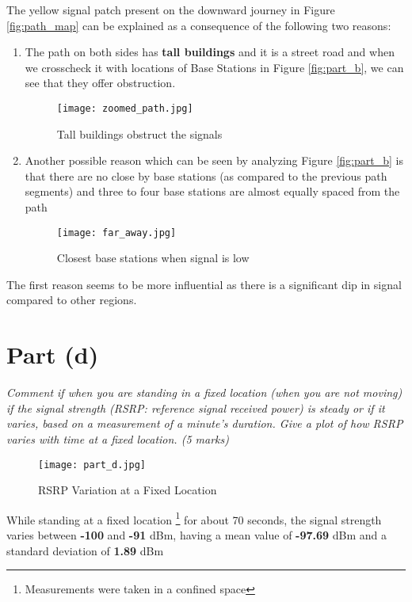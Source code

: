 \documentclass[11pt, fleqn]{article}
\begin{document}
The yellow signal patch present on the downward journey in Figure \ref{fig:path_map} can be explained as a consequence of the following two reasons:
\begin{enumerate}
    \item The path on both sides has \textbf{tall buildings} and it is a street road and when we crosscheck it with locations of Base Stations in Figure \ref{fig:part_b}, we can see that they offer obstruction.
        
    \begin{figure}[H]
        \centering
        \texttt{[image: zoomed\_path.jpg]}
        \caption{Tall buildings obstruct the signals}
    \end{figure}
    
    \item Another possible reason which can be seen by analyzing Figure \ref{fig:part_b} is that there are no close by base stations (as compared to the previous path segments) and three to four base stations are almost equally spaced from the path
    
    \begin{figure}[H]
        \centering
        \texttt{[image: far\_away.jpg]}
        \caption{Closest base stations when signal is low}
    \end{figure}
    
\end{enumerate}
The first reason seems to be more influential as there is a significant dip in signal compared to other regions.



\newpage
\section*{Part (d)}
\label{partd}
\setcounter{equation}{0}

\textit{Comment if when you are standing in a fixed location (when you are not moving) if the signal strength (RSRP: reference signal received power) is steady or if it varies, based on a measurement of a minute’s duration. Give a plot of how RSRP varies with time at a fixed location. (5 marks)}

\begin{figure}[H]
    \centering
    \texttt{[image: part\_d.jpg]}
    \caption{RSRP Variation at a Fixed Location}
\end{figure}

While standing at a fixed location 
\footnote{Measurements were taken in a confined space} 
for about 70 seconds, the signal strength varies between \textbf{-100} and
\textbf{-91} dBm, having a mean value of \textbf{-97.69} dBm and a standard deviation of \textbf{1.89} dBm\\
\end{document}
